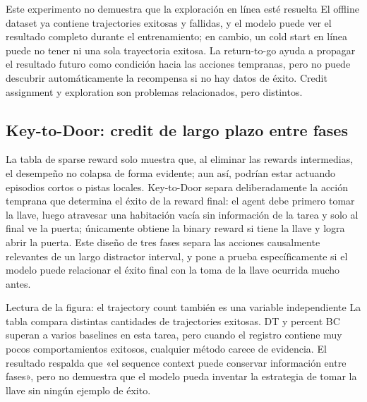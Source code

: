 \begin{warningbox}{Este experimento no demuestra que la exploración en línea esté resuelta}
El offline dataset ya contiene trajectories exitosas y fallidas, y el modelo puede ver el resultado completo durante el entrenamiento; en cambio, un cold start en línea puede no tener ni una sola trayectoria exitosa. La return-to-go ayuda a propagar el resultado futuro como condición hacia las acciones tempranas, pero no puede descubrir automáticamente la recompensa si no hay datos de éxito. Credit assignment y exploration son problemas relacionados, pero distintos.
\end{warningbox}


\subsection{Key-to-Door: credit de largo plazo entre fases}

La tabla de sparse reward solo muestra que, al eliminar las rewards intermedias, el desempeño no colapsa de forma evidente; aun así, podrían estar actuando episodios cortos o pistas locales. Key-to-Door separa deliberadamente la acción temprana que determina el éxito de la reward final: el agent debe primero tomar la llave, luego atravesar una habitación vacía sin información de la tarea y solo al final ve la puerta; únicamente obtiene la binary reward si tiene la llave y logra abrir la puerta. Este diseño de tres fases separa las acciones causalmente relevantes de un largo distractor interval, y pone a prueba específicamente si el modelo puede relacionar el éxito final con la toma de la llave ocurrida mucho antes.


\begin{knowledgebox}{Lectura de la figura: el trajectory count también es una variable independiente}
La tabla compara distintas cantidades de trajectories exitosas. DT y percent BC superan a varios baselines en esta tarea, pero cuando el registro contiene muy pocos comportamientos exitosos, cualquier método carece de evidencia. El resultado respalda que «el sequence context puede conservar información entre fases», pero no demuestra que el modelo pueda inventar la estrategia de tomar la llave sin ningún ejemplo de éxito.
\end{knowledgebox}

